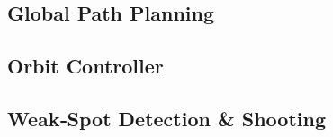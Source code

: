\subsection{Global Path Planning}\label{sec:planner}


\subsection{Orbit Controller}\label{sec:orbit}


\subsection{Weak‑Spot Detection \& Shooting}\label{sec:shooter}
